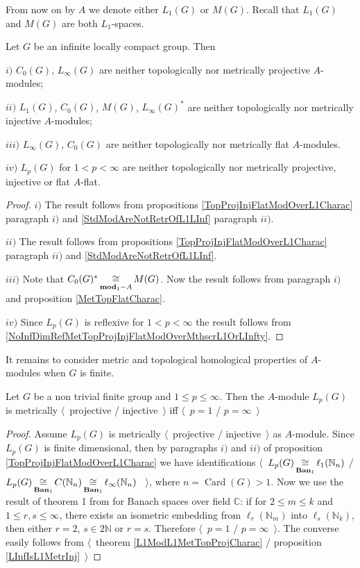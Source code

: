 From now on by $A$ we denote either $L_1(G)$ or $M(G)$. Recall that $L_1(G)$ and $M(G)$ are both $L_1$-spaces.

\begin{proposition}\label{StdModAreNotL1MGMetTopProjInjFlat} Let $G$ be an infinite locally compact group. Then

$i)$ $C_0(G)$, $L_\infty(G)$ are neither topologically nor metrically projective $A$-modules;

$ii)$ $L_1(G)$, $C_0(G)$, $M(G)$, $L_\infty(G)^*$ are neither topologically nor metrically injective $A$-modules;

$iii)$ $L_\infty(G)$, $C_0(G)$ are neither topologically nor metrically flat $A$-modules.
\end{proposition}

$iv)$ $L_p(G)$ for $1<p<\infty$ are neither topologically nor metrically projective, injective or flat $A$-flat.

\begin{proof} $i)$ The result follows from propositions \ref{TopProjInjFlatModOverL1Charac} paragraph $i)$ and  \ref{StdModAreNotRetrOfL1LInf} paragraph $ii)$.

$ii)$ The result follows from propositions \ref{TopProjInjFlatModOverL1Charac} paragraph $ii)$ and \ref{StdModAreNotRetrOfL1LInf}.

$iii)$ Note that $C_0(G)^*\mathop{\mathbin{\cong}}\limits_{\mathbf{mod}_1-A}M(G)$. Now the result follows from paragraph $i)$ and proposition \ref{MetTopFlatCharac}.

$iv)$ Since $L_p(G)$ is reflexive for $1<p<\infty$ the result follows from \ref{NoInfDimRefMetTopProjInjFlatModOverMthscrL1OrLInfty}.
\end{proof}

It remains to consider metric and topological homological properties of $A$-modules when $G$ is finite.

\begin{proposition}\label{LpFinGrL1MGMetrInjProjCharac} Let $G$ be a non trivial finite group and $1\leq p\leq \infty$. Then the $A$-module $L_p(G)$ is metrically $\langle$~projective / injective~$\rangle$ iff $\langle$~$p=1$ / $p=\infty$~$\rangle$
\end{proposition}
\begin{proof} 
Assume $L_p(G)$ is metrically $\langle$~projective / injective~$\rangle$ as $A$-module. Since $L_p(G)$ is finite dimensional, then by paragraphs $i)$ and $ii)$ of proposition \ref{TopProjInjFlatModOverL1Charac} we have identifications $\langle$~$L_p(G)\mathop{\mathbin{\cong}}\limits_{\mathbf{Ban}_1}\ell_1(\mathbb{N}_n)$ / $L_p(G)\mathop{\mathbin{\cong}}\limits_{\mathbf{Ban}_1}C(\mathbb{N}_n)\mathop{\mathbin{\cong}}\limits_{\mathbf{Ban}_1}\ell_\infty(\mathbb{N}_n)$ ~$\rangle$, where $n=\operatorname{Card}(G)>1$. Now we use the result of theorem 1 from \cite{LyubIsomEmdbFinDimLp} for Banach spaces over field $\mathbb{C}$: if for $2\leq m\leq k$ and $1\leq r,s\leq \infty$, there exists an isometric embedding from $\ell_r(\mathbb{N}_m)$ into $\ell_s(\mathbb{N}_k)$, then either $r=2$, $s\in 2\mathbb{N}$ or $r=s$. Therefore $\langle$~$p=1$ / $p=\infty$~$\rangle$. The converse easily follows from $\langle$~theorem \ref{L1ModL1MetTopProjCharac} / proposition \ref{LInfIsL1MetrInj}~$\rangle$
\end{proof}

